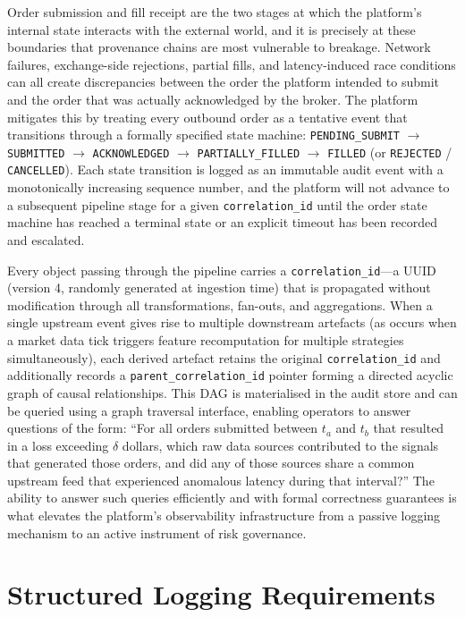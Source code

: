 \documentclass[12pt,openany]{book}
\numberwithin{equation}{chapter}
\theoremstyle{plain}
\theoremstyle{definition}
\theoremstyle{remark}
\begin{document}
Order submission and fill receipt are the two stages at which the platform's internal state interacts with the external world, and it is precisely at these boundaries that provenance chains are most vulnerable to breakage. Network failures, exchange-side rejections, partial fills, and latency-induced race conditions can all create discrepancies between the order the platform intended to submit and the order that was actually acknowledged by the broker. The platform mitigates this by treating every outbound order as a tentative event that transitions through a formally specified state machine: \texttt{PENDING\_SUBMIT} $\to$ \texttt{SUBMITTED} $\to$ \texttt{ACKNOWLEDGED} $\to$ \texttt{PARTIALLY\_FILLED} $\to$ \texttt{FILLED} (or \texttt{REJECTED} / \texttt{CANCELLED}). Each state transition is logged as an immutable audit event with a monotonically increasing sequence number, and the platform will not advance to a subsequent pipeline stage for a given \texttt{correlation\_id} until the order state machine has reached a terminal state or an explicit timeout has been recorded and escalated.

Every object passing through the pipeline carries a \texttt{correlation\_id}—a UUID (version 4, randomly generated at ingestion time) that is propagated without modification through all transformations, fan-outs, and aggregations. When a single upstream event gives rise to multiple downstream artefacts (as occurs when a market data tick triggers feature recomputation for multiple strategies simultaneously), each derived artefact retains the original \texttt{correlation\_id} and additionally records a \texttt{parent\_correlation\_id} pointer forming a directed acyclic graph of causal relationships. This DAG is materialised in the audit store and can be queried using a graph traversal interface, enabling operators to answer questions of the form: ``For all orders submitted between $t_a$ and $t_b$ that resulted in a loss exceeding $\delta$ dollars, which raw data sources contributed to the signals that generated those orders, and did any of those sources share a common upstream feed that experienced anomalous latency during that interval?'' The ability to answer such queries efficiently and with formal correctness guarantees is what elevates the platform's observability infrastructure from a passive logging mechanism to an active instrument of risk governance.

\section{Structured Logging Requirements}
\end{document}
